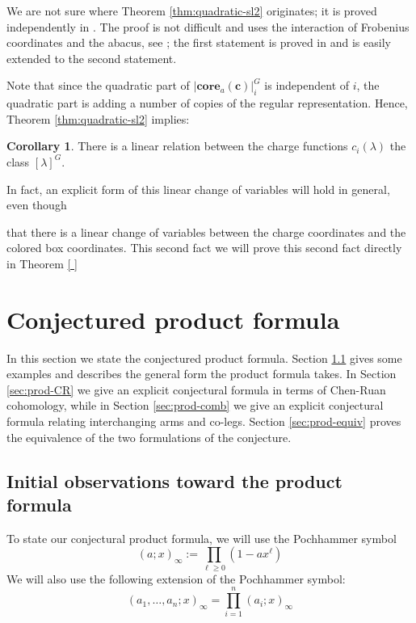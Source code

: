 \documentclass{amsart}[12pt]
\theoremstyle{definition}
\newtheorem{corollary}[dummy]{Corollary}
\newcommand{\core}{\mathbf{core}}
\begin{document}
We are not sure where Theorem \ref{thm:quadratic-sl2} originates; it is proved independently in \cite{GKS, DS}.  The proof is not difficult and uses the interaction of Frobenius coordinates and the abacus, see ; the first statement is proved in \cite{jsimultaneous} and is easily extended to the second statement. 


Note that since the quadratic part of $|\core_a(\mathbf{c})|^G_i$ is independent of $i$, the quadratic part is adding a number of copies of the regular representation.  Hence, Theorem \ref{thm:quadratic-sl2} implies:




\begin{corollary} 
There is a linear relation between the charge functions $c_i(\lambda)$ the class $[\lambda]^G$.
\end{corollary}

In fact, an explicit form of this linear change of variables will hold in general, even though



 that there is a linear change of variables between the charge coordinates and the colored box coordinates.  This second fact we will prove this second fact directly in Theorem \ref{ }



\section{Conjectured product formula}


In this section we state the conjectured product formula.  Section \ref{sec:prod-start} gives some examples and describes the general form the product formula takes.  In Section \ref{sec:prod-CR} we give an explicit conjectural formula in terms of Chen-Ruan cohomology, while in Section \ref{sec:prod-comb} we give an explicit conjectural formula relating interchanging arms and co-legs.  Section \ref{sec:prod-equiv} proves the equivalence of the two formulations of the conjecture.


\subsection{Initial observations toward the product formula}
\label{sec:prod-start}

To state our conjectural product formula, we will use the Pochhammer symbol 
$$(a;x)_\infty:=\prod_{\ell\geq 0} (1-ax^\ell)$$
We will also use the following extension of the Pochhammer symbol:
$$(a_1,\dots, a_n; x)_\infty=\prod_{i=1}^n (a_i;x)_\infty$$
\end{document}
